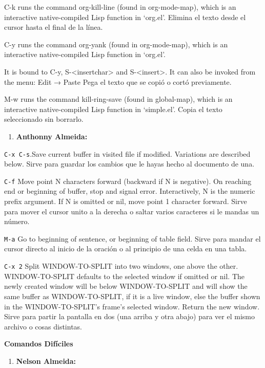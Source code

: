 \documentclass{article}
\begin{document}
C-k runs the command org-kill-line (found in org-mode-map), which is
an interactive native-compiled Lisp function in ‘org.el’.
 Elimina el texto desde el cursor hasta el final de la línea.

C-y runs the command org-yank (found in org-mode-map), which is an
interactive native-compiled Lisp function in ‘org.el’.

It is bound to C-y, S-<insertchar> and S-<insert>.
It can also be invoked from the menu: Edit → Paste
Pega el texto que se copió o cortó previamente.

M-w runs the command kill-ring-save (found in global-map), which is an
interactive native-compiled Lisp function in ‘simple.el’.
Copia el texto seleccionado sin borrarlo.

\begin{enumerate}
\item \textbf{\textbf{Anthonny Almeida:}}
\end{enumerate}
\texttt{C-x C-s}.Save current buffer in visited file if modified.
Variations are described below.
Sirve para guardar los cambios que le hayas hecho al documento de una.

\texttt{C-f} Move point N characters forward (backward if N is negative).
On reaching end or beginning of buffer, stop and signal error.
Interactively, N is the numeric prefix argument.
If N is omitted or nil, move point 1 character forward.
Sirve para mover el cursor unito a la derecha o saltar varios caracteres si le mandas un número.

\texttt{M-a} Go to beginning of sentence, or beginning of table field.
Sirve para mandar el cursor directo al inicio de la oración o al principio de una celda en una tabla.

\texttt{C-x 2} Split WINDOW-TO-SPLIT into two windows, one above the other.
WINDOW-TO-SPLIT defaults to the selected window if omitted or nil.
The newly created window will be below WINDOW-TO-SPLIT and will show
the same buffer as WINDOW-TO-SPLIT, if it is a live window, else the
buffer shown in the WINDOW-TO-SPLIT’s frame’s selected window.
Return the new window.
Sirve para partir la pantalla en dos (una arriba y otra abajo) para ver el mismo archivo o cosas distintas.



\textbf{\textbf{Comandos Difíciles}}

\begin{enumerate}
\item \textbf{\textbf{Nelson Almeida:}}
\end{enumerate}
\end{document}
